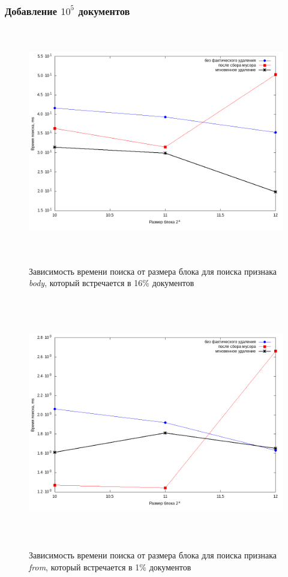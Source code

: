 \subsubsection{Добавление $10^5$ документов}

\begin{figure}[H]
\includegraphics[width=\linewidth, height=10cm]{fig/limit_1e6/1e5/body.png}
\caption{Зависимость времени поиска от размера блока для поиска признака \textit{body}, который встречается в 16\% документов}
\includegraphics[width=\linewidth, height=11cm]{fig/limit_1e6/1e5/from.png}
\caption{Зависимость времени поиска от размера блока для поиска признака \textit{from}, который встречается в 1\% документов}
\end{figure}

